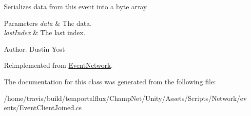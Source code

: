 Serializes data from this event into a byte array 


\begin{DoxyParams}{Parameters}
{\em data} & The data.\\
\hline
{\em last\-Index} & The last index.\\
\hline
\end{DoxyParams}


Author\-: Dustin Yost 

Reimplemented from \hyperlink{class_event_network_ae2574cdc2bb836f3e41628ff1c095238}{Event\-Network}.



The documentation for this class was generated from the following file\-:\begin{DoxyCompactItemize}
\item 
/home/travis/build/temportalflux/\-Champ\-Net/\-Unity/\-Assets/\-Scripts/\-Network/events/Event\-Client\-Joined.\-cs\end{DoxyCompactItemize}

